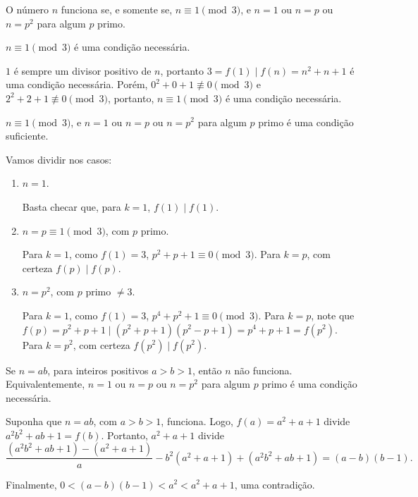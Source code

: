 \documentclass[11pt,a4paper]{article}
\begin{document}
	\newpage
	\begin{ans}
		O número \(n\) funciona se, e somente se, \(n \equiv 1 \pmod{3}\), e \(n = 1\) ou \(n = p\) ou \(n = p^2\) para algum \(p\) primo.
	\end{ans}
	\begin{sol}
		\begin{lem}
			\(n \equiv 1 \pmod{3}\) é uma condição necessária.
		\end{lem}
		\begin{dem}
			\(1\) é sempre um divisor positivo de \(n\), portanto \(3 = f(1) \mid f(n) = n^2 + n + 1\) é uma condição necessária. Porém, \(0^2 + 0 + 1 \not\equiv 0 \pmod{3}\) e \(2^2 + 2 + 1 \not\equiv 0 \pmod{3}\), portanto, \(n \equiv 1 \pmod{3}\) é uma condição necessária.
		\end{dem}
		\begin{lem}
			\(n \equiv 1 \pmod{3}\), e
			\(n = 1\) ou \(n = p\) ou \(n = p^2\) 
			para algum \(p\) primo é uma condição suficiente.
		\end{lem}
		\begin{dem} Vamos dividir nos casos:
			\begin{enumerate}[label = \textit{\roman*}.]
				\item \(n = 1\).
					
					Basta checar que, para \(k = 1\), \(f(1) \mid f(1)\).

				\item \(n = p \equiv {1} \pmod{3}\), com \(p\) primo.

					Para \(k = 1\), como \(f(1) = 3\), \(p^2 + p + 1 \equiv 0 \pmod{3}\).
					Para \(k = p\), com certeza \(f(p) \mid f(p)\). 

				\item \(n = p^2\), com \(p\) primo \( \neq 3\).

					Para \(k = 1\), como \(f(1) = 3\), \(p^4 + p^2 + 1 \equiv 0 \pmod{3}\).
					Para \(k = p\), note que \(f(p) = p^2 + p + 1 \mid (p^2 + p + 1)(p^2 - p + 1) = p^4 + p + 1 = f(p^2)\).
					Para \(k = p^2\), com certeza \(f(p^2) \mid f(p^2)\).
			\end{enumerate}
		\end{dem}

		\begin{lem}
			Se \(n = ab\), para inteiros positivos \(a > b > 1\), então \(n\) não funciona.
			Equivalentemente, \(n = 1\) ou \(n = p\) ou \(n = p^2\) para algum \(p\) primo é uma condição necessária.
		\end{lem}
		\begin{dem}
			Suponha que \(n = ab\), com \(a > b > 1\), funciona. Logo,
			\(f(a) = a^2 + a + 1\) divide \(a^2b^2 + ab + 1 = f(b)\). Portanto, \(a^2 + a + 1\) divide
			\begin{equation*}
				\frac{(a^2b^2 + ab + 1) - (a^2 + a + 1)}{a} - b^2(a^2 + a + 1) + (a^2b^2 + ab + 1) = (a-b)(b-1).
			\end{equation*}

			Finalmente, \(0 < (a-b)(b-1) < a^2 < a^2 + a + 1\), uma contradição.
		\end{dem}

	\end{sol}
\end{document}
